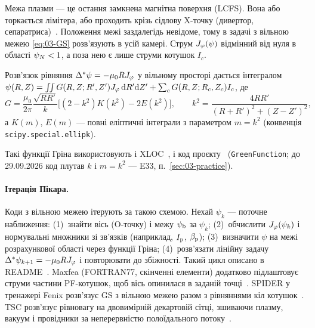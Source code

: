 Межа плазми --- це остання замкнена магнітна поверхня (LCFS). Вона або торкається лімітера, або проходить крізь сідлову X-точку (дивертор, сепаратриса)~\cite[с.~30]{Merlo2011}. Положення межі заздалегідь невідоме, тому в задачі з вільною межею \eqref{eq:03-GS} розв'язують в усій камері. Струм $J_{\varphi}(\psi)$ відмінний від нуля в області $\psi_{N}<1$, а поза нею є лише струми котушок $I_c$.

\begin{outofcorpus}
Розв'язок рівняння $\Delta^{*}\psi=-\mu_0RJ_{\varphi}$ у вільному просторі дається інтегралом
$\psi(R,Z)=\iint G(R,Z;R',Z')J_{\varphi}\,\mathrm{d} R'\mathrm{d} Z'+\sum_cG(R,Z;R_c,Z_c)I_c$, де
\begin{equation}\label{eq:03-green}
G=\frac{\mu_0}{2\pi}\frac{\sqrt{RR'}}{k}\Big[(2-k^2)K(k^2)-2E(k^2)\Big],\qquad k^2=\frac{4RR'}{(R+R')^2+(Z-Z')^2},
\end{equation}
а $K(m)$, $E(m)$ --- повні еліптичні інтеграли з параметром $m=k^2$ (конвенція \texttt{scipy.special.ellipk}).
\end{outofcorpus}
Такі функції Гріна використовують і XLOC~\cite[с.~48]{Merlo2011}, і код проєкту~\cite{ProjGSsolver} (\texttt{GreenFunction}; до 29.09.2026 код плутав $k$ і $m=k^2$ --- E33, п.~\ref{sec:03-practice}).

\paragraph{Ітерація Пікара.} Коди з вільною межею ітерують за такою схемою. Нехай $\psi_k$ --- поточне наближення: (1)~знайти вісь (O-точку) і межу $\psi_{\mathrm{b}}$ за $\psi_k$; (2)~обчислити $J_{\varphi}(\psi_k)$ і нормувальні множники зі зв'язків (наприклад, $I_{\mathrm{p}}$, $\beta_{\mathrm{p}}$); (3)~визначити $\psi$ на межі розрахункової області через функції Гріна; (4)~розв'язати лінійну задачу $\Delta^{*}\psi_{k+1}=-\mu_0RJ_{\varphi}$ і повторювати до збіжності.
Такий цикл описано в README~\cite{ProjGSsolver}. Maxfea (FORTRAN77, скінченні елементи) додатково підлаштовує струми частини PF-котушок, щоб вісь опинилася в заданій точці~\cite[с.~31--32]{Merlo2011}. SPIDER у тренажері Fenix розв'язує GS з вільною межею разом з рівняннями кіл котушок~\cite[с.~4]{Fable2022}. TSC розв'язує рівновагу на двовимірній декартовій сітці, зшиваючи плазму, вакуум і провідники за неперервністю полоїдального потоку~\cite{Jardin2000}.

